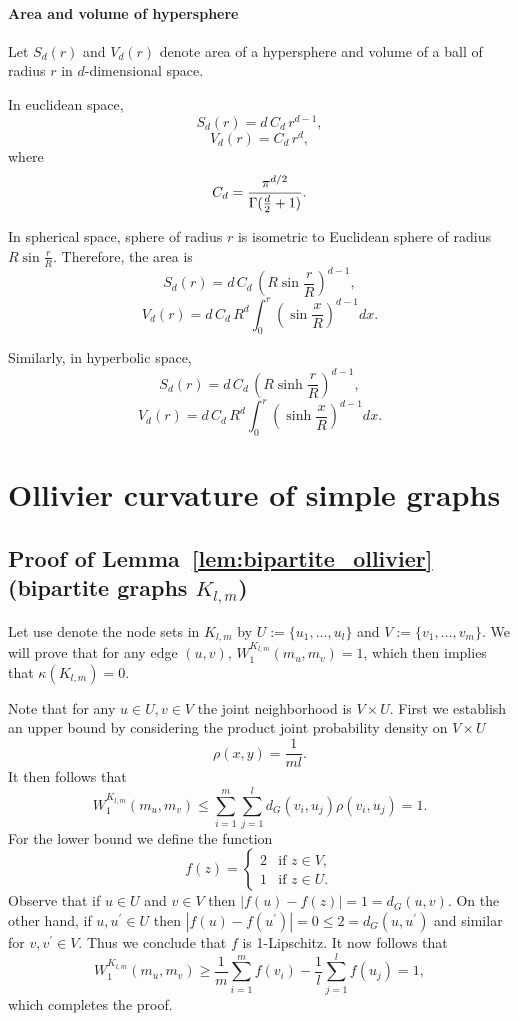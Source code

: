 \documentclass{article} %
\begin{document}
\paragraph{Area and volume of hypersphere}

Let $S_d(r)$ and $V_d(r)$ denote area of a hypersphere and volume of a ball of radius $r$ in $d$-dimensional space. 

In euclidean space,
\[
S_d(r)= d \, C_{d} \, r^{d-1},
\]
\[
V_d(r)= C_{d} \, r^{d},
\]
where
\[
C_{d}={\frac  {\pi ^{{d/2}}}{\Gamma ({d \over 2}+1)}}.
\]

In spherical space, sphere of radius $r$ is isometric to Euclidean sphere of radius $R \sin \frac{r}{R}$. Therefore, the area is 
\[
S_d(r)= d \, C_{d} \, \left( R \sin \frac{r}{R} \right)^{d-1},
\]
\[
V_d(r)= d \, C_{d} \, R^d \int_{0}^{r} \left( \sin \frac{x}{R} \right)^{d-1} d x .
\]

Similarly, in hyperbolic space,
\[
S_d(r)= d \, C_{d} \, \left( R \sinh \frac{r}{R} \right)^{d-1},
\]
\[
V_d(r)= d \, C_{d} \, R^d \int_{0}^{r} \left( \sinh \frac{x}{R} \right)^{d-1} d x .
\]


\section{Ollivier curvature of simple graphs}

\subsection{Proof of Lemma~\ref{lem:bipartite_ollivier} (bipartite graphs $K_{l,m}$)}

Let use denote the node sets in $K_{l,m}$ by $U := \{u_1, \dots, u_l\}$ and $V := \{v_1, \dots, v_m\}$. We will prove that for any edge $(u, v)$, $W_1^{K_{l,m}}(m_{u},m_{v}) = 1$, which then implies that $\kappa(K_{l,m}) = 0$. 

Note that for any $u \in U, v \in V$ the joint neighborhood is $V \times U$. First we establish an upper bound by considering the product joint probability density on $V \times U$
\[
	\rho(x,y) =	\frac{1}{m l}.
\]
It then follows that
\[
	W_1^{K_{l,m}}(m_{u},m_{v}) \le \sum_{i = 1}^m \sum_{j = 1}^l d_G(v_i, u_j) \rho(v_i, u_j)
	= 1.
\]
For the lower bound we define the function
\[
	f(z) = \begin{cases}
		2 &\mbox{if } z \in V,\\
		1 &\mbox{if } z \in U.
	\end{cases}
\]
Observe that if $u \in U$ and $v \in V$ then $|f(u) - f(z)| = 1 = d_G(u,v)$. On the other hand, if $u, u^\prime \in U$ then $|f(u) - f(u^\prime)| = 0 \le 2 = d_G(u,u^\prime)$ and similar for $v, v^\prime \in V$. Thus we conclude that $f$ is 1-Lipschitz. It now follows that
\[
	W_1^{K_{l,m}}(m_u,m_v) \ge \frac{1}{m} \sum_{i = 1}^m f(v_i) - \frac{1}{l} \sum_{j = 1}^l f(u_j) = 1,
\]
which completes the proof.
\end{document}
